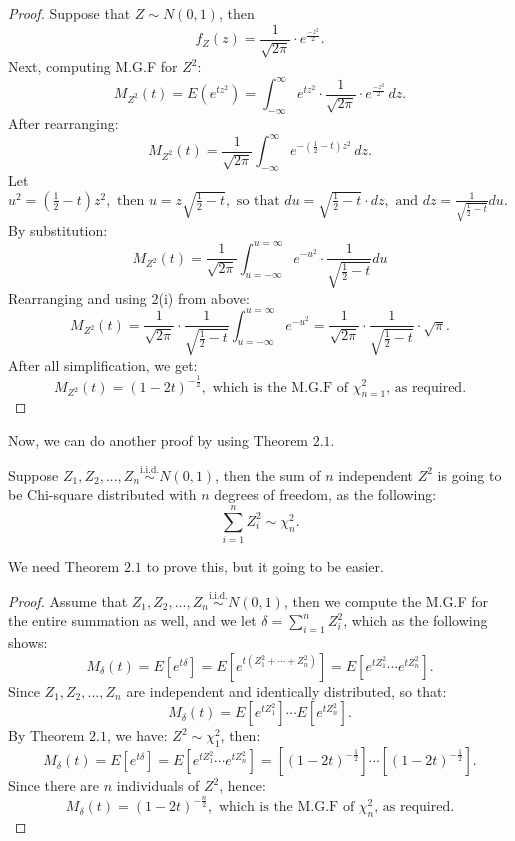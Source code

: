 \begin{proof}
Suppose that $Z \sim N(0, 1)$, then \[ f_{Z}(z) = \frac{1}{\sqrt{2\pi}} \cdot e^{\frac{-z^2}{2}}.\] 
\hspace*{2.7em} Next, computing M.G.F for $Z^2$: \[ M_{Z^2}(t) = E(e^{tz^2}) = \int_{-\infty}^{\infty} e^{tz^2} \cdot \frac{1}{\sqrt{2\pi}} \cdot e^{\frac{-z^2}{2}}\, dz.\]
\hspace*{2.7em} After rearranging: \[  M_{Z^2}(t) = \frac{1}{\sqrt{2\pi}} \int_{-\infty}^{\infty} e^{-(\frac{1}{2} - t)z^2}\, dz. \]
\hspace*{2.7em} Let $u^2 = (\frac{1}{2} - t)z^2, \text{ then } u = z\sqrt{\frac{1}{2}-t}, \text{ so that } du = \sqrt{\frac{1}{2}-t} \cdot dz, \text{ and } dz = \frac{1}{\sqrt{\frac{1}{2}-t}}du.$
\hspace*{2.7em} By substitution: \[ M_{Z^2}(t) = \frac{1}{\sqrt{2\pi}} \int_{u = -\infty}^{u = \infty} e^{-u^2} \cdot \frac{1}{\sqrt{\frac{1}{2}-t}}du\]
\hspace*{2.7em} Rearranging and using 2(i) from above: \[ M_{Z^2}(t) = \frac{1}{\sqrt{2\pi}} \cdot \frac{1}{\sqrt{\frac{1}{2}-t}} \int_{u = -\infty}^{u = \infty} e^{-u^2} = \frac{1}{\sqrt{2\pi}} \cdot \frac{1}{\sqrt{\frac{1}{2}-t}} \cdot \sqrt{\pi}.\]
\hspace*{2.7em} After all simplification, we get: \[ M_{Z^2}(t) = (1-2t)^{-\frac{1}{2}}, \text{ which is the M.G.F of $\chi_{n = 1}^{2}$, as required.}\]
\end{proof}

\noindent
Now, we can do another proof by using Theorem $2.1$.

\begin{theorem}[$ \sum_{i = 1}^{n}Z_{i}^{2} \sim \chi_{n}^{2}$]
Suppose $Z_1, Z_2, ..., Z_n \overset{\text{i.i.d.}}{\sim} N(0,1)$, then the sum of $n$ independent $Z^2$ is going to be Chi-square distributed with $n$ degrees of freedom, as the following: \[ \sum_{i=1}^{n}Z_{i}^{2} \sim \chi_{n}^{2}.\]
\end{theorem}

\noindent
We need Theorem $2.1$ to prove this, but it going to be easier. 

\begin{proof}
Assume that $Z_1, Z_2, ..., Z_n \overset{\text{i.i.d.}}{\sim} N(0,1)$, then we compute the M.G.F for the entire summation as well, and we let $\delta = \sum_{i = 1}^{n} Z_{i}^{2}$, which as the following shows: \[ M_{\delta}(t) = E[e^{t\delta}] = E[e^{t(Z_1^2 + \cdots + Z_n^2)}] = E[e^{tZ_1^2} \cdots e^{tZ_n^2}].\]
\hspace*{2.7em} Since $Z_1, Z_2, ..., Z_n$ are independent and identically distributed, so that: \[ M_{\delta}(t) = E[e^{tZ_1^2}] \cdots E[e^{tZ_n^2}].\]
\hspace*{2.7em} By Theorem $2.1$, we have: $Z^2 \sim \chi_{1}^{2}$, then: \[ M_{\delta}(t) = E[e^{t\delta}] = E[e^{tZ_1^2} \cdots e^{tZ_n^2}] = [(1-2t)^{-\frac{1}{2}}] \cdots [(1-2t)^{-\frac{1}{2}}].\]
\hspace*{2.7em} Since there are $n$ individuals of $Z^2$, hence: \[ M_{\delta}(t) = (1-2t)^{-\frac{n}{2}}, \text{ which is the M.G.F of $\chi_{n}^{2}$, as required}.\]
\end{proof}

